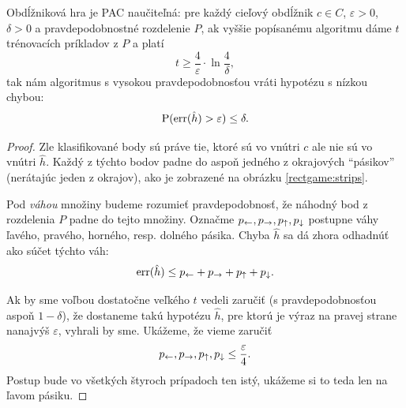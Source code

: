 \begin{theorem}
  Obdĺžniková hra je PAC naučiteľná: pre každý cieľový obdĺžnik $c \in C$,
  $\varepsilon > 0$, $\delta > 0$ a pravdepodobnostné rozdelenie $P$, ak
  vyššie popísanému algoritmu dáme $t$ trénovacích príkladov z $P$ a
  platí
  $$ t \geq \frac{4}{\varepsilon} \cdot \ln{\frac{4}{\delta}}, $$
  tak nám algoritmus s vysokou pravdepodobnosťou vráti hypotézu s nízkou
  chybou:
  $$ \operatorname*{\mathrm{P}}(\mathrm{err}(\hat{h}) > \varepsilon) \leq \delta. $$
\end{theorem}
\begin{proof}
  Zle klasifikované body sú práve tie, ktoré sú vo vnútri $c$ ale nie sú
  vo vnútri $\hat{h}$. Každý z týchto bodov padne do aspoň jedného
  z okrajových ``pásikov'' (nerátajúc jeden z okrajov), ako je
  zobrazené na obrázku \ref{rectgame:strips}.
  
  Pod \emph{váhou} množiny budeme rozumieť pravdepodobnosť, že náhodný
  bod z rozdelenia $P$ padne do tejto množiny.
  Označme $p_\leftarrow, p_\rightarrow, p_\uparrow, p_\downarrow$ postupne váhy ľavého,
  pravého, horného, resp. dolného pásika. Chyba $\hat{h}$ sa dá zhora
  odhadnúť ako súčet týchto váh:
  $$ \mathrm{err}(\hat{h}) \leq p_\leftarrow + p_\rightarrow + p_\uparrow + p_\downarrow. $$
  
  Ak by sme voľbou dostatočne veľkého $t$ vedeli zaručiť
  (s pravdepodobnosťou aspoň $1 - \delta$), že dostaneme takú hypotézu
  $\hat{h}$, pre ktorú je výraz na pravej strane nanajvýš $\varepsilon$,
  vyhrali by sme. Ukážeme, že vieme zaručiť
  $$ p_\leftarrow, p_\rightarrow, p_\uparrow, p_\downarrow \leq \frac{\varepsilon}{4}. $$
  Postup bude vo všetkých štyroch prípadoch ten istý, ukážeme si to
  teda len na ľavom pásiku.
  

\end{proof}
